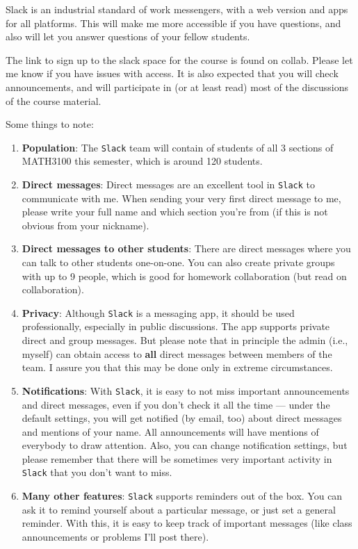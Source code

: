 \documentclass[oneside,11pt]{amsart}
\begin{document}
Slack is an
industrial standard of work messengers, with a web version and apps for all
platforms. This will make me more accessible if you have questions, and also
will let you answer questions of your fellow students.

The link to sign up to the slack space for the course is found on collab.
Please
let me know if you have issues with access. 
It is also expected that you
will check announcements, and will participate in (or at least read)
most of the discussions of the course material.

Some things to note: 
\begin{enumerate}[$\bullet$] 
	\item \textbf{Population}:
		The \texttt{Slack} team will contain of students
		of all 3 sections of MATH3100 this semester, which is 
		around 120 students.
	\item \textbf{Direct messages}:
		Direct messages are an excellent tool in \texttt{Slack} to communicate
		with me. When sending your very first direct message to me, please 
		write your full name and which section you're from (if this is not obvious from your nickname).
	\item \textbf{Direct messages to other students}:
		There are direct messages where you can talk to other students
		one-on-one. 
		You can also create private groups with up to 9 people, which
		is good for homework collaboration (but read  on
		collaboration).
	\item \textbf{Privacy}:
		Although \texttt{Slack} is a messaging app, it should be used
		professionally, especially in public discussions. The app supports private
		direct and group messages. But please note that in principle the admin
		(i.e., myself) can obtain access to \textbf{all} direct messages between
		members of the team. 
		I assure you that this may be done only in extreme circumstances.
	\item \textbf{Notifications}:
		With \texttt{Slack}, it is easy to not miss important announcements and direct messages, 
		even if 
		you don't check it all the time --- 
		under the default settings, you will get notified (by email, too)
		about direct messages and mentions of your name. 
		All announcements will have mentions of everybody
		to draw attention. 
		Also, you can change notification settings, but please remember that
		there will be sometimes very important activity in \texttt{Slack} that you don't want to miss.
	\item \textbf{Many other features}: 
		\texttt{Slack} supports reminders out of the box. 
		You can ask it to remind yourself about a particular message, or 
		just set a general reminder. 
		With this, it is 
		easy to keep track of important messages
		(like class announcements or problems I'll post there).
\end{enumerate}
\end{document}
